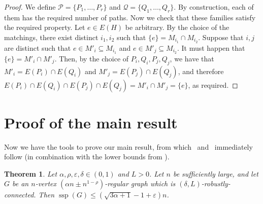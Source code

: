 \documentclass[a4paper, 11pt,reqno]{amsart}
\theoremstyle{plain}
\newtheorem{theorem}{Theorem}[section]
\theoremstyle{definition}
\numberwithin{equation}{section}
\DeclareMathOperator{\ssp}{ssp}
\begin{document}
\begin{proof}
  We define $\mathcal{P} = \{P_1, \dotsc, P_r\}$ and $\mathcal{Q} =
  \{Q_1, \dotsc, Q_r\}$.  By construction, each of them has the
  required number of paths.  Now we check that these families satisfy
  the required property.  Let $e \in E(H)$ be arbitrary.  By the
  choice of the matchings, there exist distinct $i_1, i_2$ such that
  $\{e\} = M_{i_1} \cap M_{i_2}$.  Suppose that $i, j$ are
  distinct such that $e \in M'_i \subseteq M_{i_1}$ and $e \in M'_j
  \subseteq M_{i_2}$.  It must happen that $\{e\} = M'_i \cap M'_j$.  
  Then, by the choice of $P_i, Q_i, P_j, Q_j$, we have that
  $M'_i = E(P_i) \cap E(Q_i)$ and $M'_j = E(P_j) \cap E(Q_j)$, and 
  therefore $E(P_i) \cap E(Q_i) \cap E(P_j) \cap E(Q_j) = M'_i \cap M'_j = \{e\}$, 
  as required.
\end{proof}

\section{Proof of the main result}\label{sec:mainresult}

Now we have the tools to prove our main result, from
which~ and~
immediately follow (in combination with the lower bounds from
).

\begin{theorem} \label{theorem:main}
	Let $\alpha, \rho, \varepsilon, \delta \in (0,1)$ and $L > 0$.
	Let $n$ be sufficiently large, and let $G$ be an $n$-vertex $(\alpha n \pm n^{1 - \rho})$-regular graph which is $(\delta,L)$-robustly-connected.
	Then $\ssp(G) \leq (\sqrt{3 \alpha + 1} - 1 + \varepsilon)n$.
\end{theorem}
\end{document}
